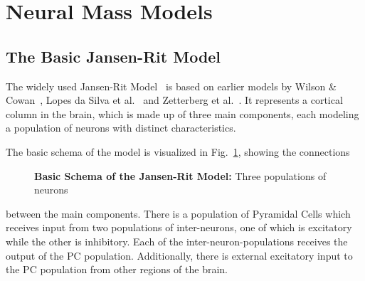 \newcommand*\circled[2][black]{\tikz[baseline=(char.base)]{
    \node[scale=0.85pt,shape=circle, thin,draw=#1!60, fill=#1!5,inner sep=0.1pt] (char) {#2};}}



\section{Neural Mass Models}\label{sec:neural-mass-models}

\subsection{The Basic Jansen-Rit Model}\label{subsec:the-jansen-rit-model}

The widely used Jansen-Rit Model~\cite{jansen_neurophysiologically-based_1993, jansen_electroencephalogram_1995}
is based on earlier models by Wilson \& Cowan~\cite{wilson_excitatory_1972},
Lopes da Silva et al.~\cite{lopes_da_silva_model_1974, lopes_da_silva_models_1976} and
Zetterberg et al.~\cite{zetterberg_performance_1978}.
It represents a cortical column in the brain, which is made up of three main components,
each modeling a population of neurons with distinct characteristics.

The basic schema of the model is visualized in Fig.~\ref{fig:Jansen Rit Flowchart}, showing the connections
\begin{figure}
    
    \caption{\textbf{Basic Schema of the Jansen-Rit Model:} Three populations of neurons}
    \label{fig:Jansen Rit Flowchart}
\end{figure}
between the main components.
There is a population of Pyramidal Cells which receives input from two populations of inter-neurons,
one of which is excitatory while the other is inhibitory.
Each of the inter-neuron-populations receives the output of the PC population.
Additionally, there is external excitatory input to the PC population from other regions of the brain.

